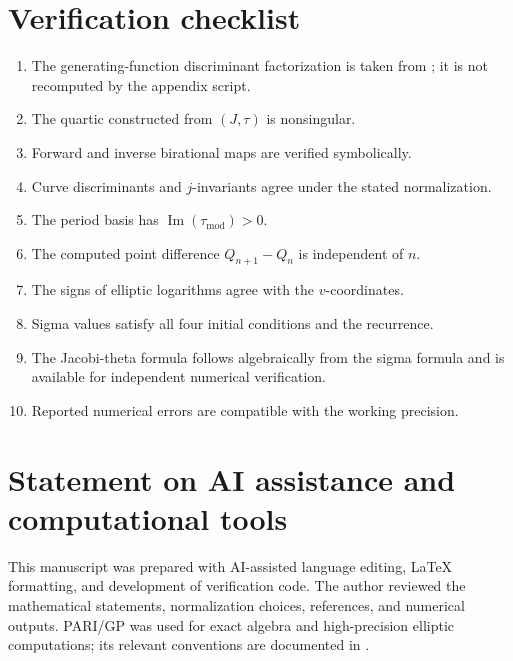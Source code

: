 \documentclass[11pt]{article}
\newcommand{\taupar}{\tau}
\newcommand{\taumod}{\tau_{\mathrm{mod}}}
\begin{document}
\section{Verification checklist}
\begin{enumerate}[leftmargin=2.4em]
  \item The generating-function discriminant factorization is taken from
        \cite{Scheuerle2026}; it is not recomputed by the appendix script.
  \item The quartic constructed from $(J,\taupar)$ is nonsingular.
  \item Forward and inverse birational maps are verified symbolically.
  \item Curve discriminants and $j$-invariants agree under the stated
        normalization.
  \item The period basis has $\operatorname{Im}(\taumod)>0$.
  \item The computed point difference $Q_{n+1}-Q_n$ is independent of $n$.
  \item The signs of elliptic logarithms agree with the $v$-coordinates.
  \item Sigma values satisfy all four initial conditions and the recurrence.
  \item The Jacobi-theta formula follows algebraically from the sigma formula
        and is available for independent numerical verification.
  \item Reported numerical errors are compatible with the working precision.
\end{enumerate}

\section{Statement on AI assistance and computational tools}
This manuscript was prepared with AI-assisted language editing, \LaTeX{}
formatting, and development of verification code. The author reviewed the
mathematical statements, normalization choices, references, and numerical
outputs. PARI/GP was used for exact algebra and high-precision elliptic
computations; its relevant conventions are documented in
\cite{PARIGPManual}.
\end{document}
